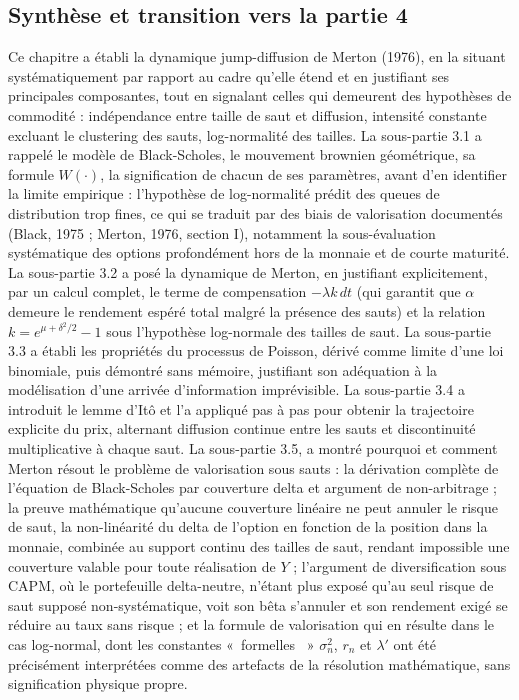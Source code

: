 \documentclass{article}
\providecommand{\og}{«~}
\providecommand{\fg}{~»}
\begin{document}
\subsection{Synthèse et transition vers la partie 4}
Ce chapitre a établi la dynamique jump-diffusion de Merton (1976), en la situant systématiquement par rapport au cadre qu'elle étend et en justifiant ses principales composantes, tout en signalant celles qui demeurent des hypothèses de commodité : indépendance entre taille de saut et diffusion, intensité constante excluant le clustering des sauts, log-normalité des tailles.
La sous-partie 3.1 a rappelé le modèle de Black-Scholes, le mouvement brownien géométrique, sa formule $W(\cdot)$, la signification de chacun de ses paramètres, avant d'en identifier la limite empirique : l'hypothèse de log-normalité prédit des queues de distribution trop fines, ce qui se traduit par des biais de valorisation documentés (Black, 1975 ; Merton, 1976, section I), notamment la sous-évaluation systématique des options profondément hors de la monnaie et de courte maturité. La sous-partie 3.2 a posé la dynamique de Merton, en justifiant explicitement, par un calcul complet, le terme de compensation $-\lambda k\,dt$ (qui garantit que $\alpha$ demeure le rendement espéré total malgré la présence des sauts) et la relation $k=e^{\mu+\delta^2/2}-1$ sous l'hypothèse log-normale des tailles de saut.
La sous-partie 3.3 a établi les propriétés du processus de Poisson, dérivé comme limite d'une loi binomiale, puis démontré sans mémoire, justifiant son adéquation à la modélisation d'une arrivée d'information imprévisible. La sous-partie 3.4 a introduit le lemme d'Itô et l'a appliqué pas à pas pour obtenir la trajectoire explicite du prix, alternant diffusion continue entre les sauts et discontinuité multiplicative à chaque saut.
La sous-partie 3.5, a montré pourquoi et comment Merton résout le problème de valorisation sous sauts : la dérivation complète de l'équation de Black-Scholes par couverture delta et argument de non-arbitrage ; la preuve mathématique qu'aucune couverture linéaire ne peut annuler le risque de saut, la non-linéarité du delta de l'option en fonction de la position dans la monnaie, combinée au support continu des tailles de saut, rendant impossible une couverture valable pour toute réalisation de $Y$ ; l'argument de diversification sous CAPM, où le portefeuille delta-neutre, n'étant plus exposé qu'au seul risque de saut supposé non-systématique, voit son bêta s'annuler et son rendement exigé se réduire au taux sans risque ; et la formule de valorisation qui en résulte dans le cas log-normal, dont les constantes \og formelles \fg{} $\sigma_n^2$, $r_n$ et $\lambda'$ ont été précisément interprétées comme des artefacts de la résolution mathématique, sans signification physique propre.
\end{document}
